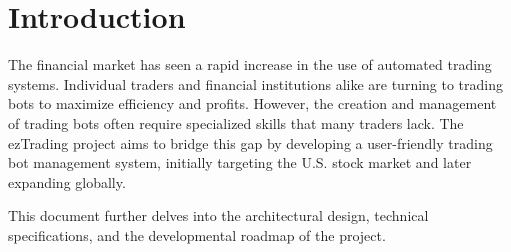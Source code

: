 
\section{Introduction}

The financial market has seen a rapid increase in the use of automated trading systems. Individual traders and financial institutions alike are turning to trading bots to maximize efficiency and profits. However, the creation and management of trading bots often require specialized skills that many traders lack. The ezTrading project aims to bridge this gap by developing a user-friendly trading bot management system, initially targeting the U.S. stock market and later expanding globally.

This document further delves into the architectural design, technical specifications, and the developmental roadmap of the project.